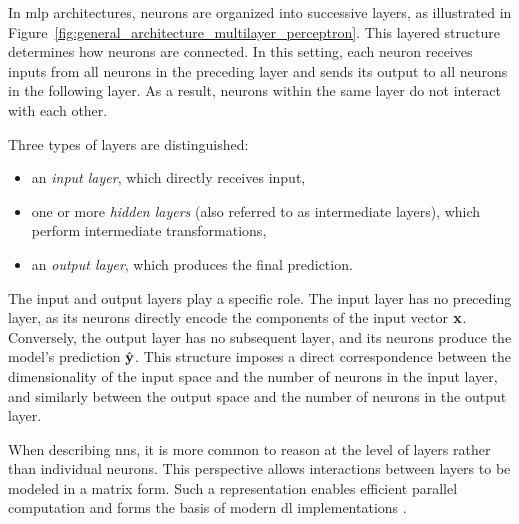 In \gls{mlp} architectures, neurons are organized into successive layers, as illustrated in Figure~\ref{fig:general_architecture_multilayer_perceptron}.
This layered structure determines how neurons are connected.
In this setting, each neuron receives inputs from all neurons in the preceding layer and sends its output to all neurons in the following layer.
As a result, neurons within the same layer do not interact with each other.



Three types of layers are distinguished:
\begin{itemize}
\item an \emph{input layer}, which directly receives input,
\item one or more \emph{hidden layers} (also referred to as intermediate layers), which perform intermediate transformations,
\item an \emph{output layer}, which produces the final prediction.
\end{itemize}

The input and output layers play a specific role.
The input layer has no preceding layer, as its neurons directly encode the components of the input vector $\mathbf{x}$.
Conversely, the output layer has no subsequent layer, and its neurons produce the model's prediction $\hat{\mathbf{y}}$.
This structure imposes a direct correspondence between the dimensionality of the input space and the number of neurons in the input layer, and similarly between the output space and the number of neurons in the output layer.

When describing \glspl{nn}, it is more common to reason at the level of layers rather than individual neurons.
This perspective allows interactions between layers to be modeled in a matrix form.
Such a representation enables efficient parallel computation and forms the basis of modern \gls{dl} implementations \parencite{krizhevsky2012imagenet}.

